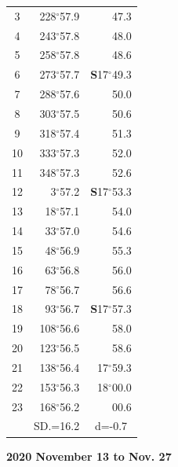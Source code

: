 \documentclass[10pt, a4paper]{report}
\begin{document}
\begin{scriptsize}
\begin{tabular*}{0.2\textwidth}[t]{@{\extracolsep{\fill}}|c|rr|}
3 & 228$^\circ$57.9 & \raisebox{0.24ex}{\boldmath$\cdot$~\boldmath$\cdot$~~}47.3\\
4 & 243$^\circ$57.8 & 48.0\\
5 & 258$^\circ$57.8 & 48.6\\[2Pt]
6 & 273$^\circ$57.7 & \textbf{S}17$^\circ$49.3\\
7 & 288$^\circ$57.6 & 50.0\\
8 & 303$^\circ$57.5 & 50.6\\
9 & 318$^\circ$57.4 & \raisebox{0.24ex}{\boldmath$\cdot$~\boldmath$\cdot$~~}51.3\\
10 & 333$^\circ$57.3 & 52.0\\
11 & 348$^\circ$57.3 & 52.6\\[2Pt]
12 & 3$^\circ$57.2 & \textbf{S}17$^\circ$53.3\\
13 & 18$^\circ$57.1 & 54.0\\
14 & 33$^\circ$57.0 & 54.6\\
15 & 48$^\circ$56.9 & \raisebox{0.24ex}{\boldmath$\cdot$~\boldmath$\cdot$~~}55.3\\
16 & 63$^\circ$56.8 & 56.0\\
17 & 78$^\circ$56.7 & 56.6\\[2Pt]
18 & 93$^\circ$56.7 & \textbf{S}17$^\circ$57.3\\
19 & 108$^\circ$56.6 & 58.0\\
20 & 123$^\circ$56.5 & 58.6\\
21 & 138$^\circ$56.4 & 17$^\circ$59.3\\
22 & 153$^\circ$56.3 & 18$^\circ$00.0\\
23 & 168$^\circ$56.2 & 00.6\\
\hline
\rule{0pt}{2.4ex} & \multicolumn{1}{c}{SD.=16.2} & \multicolumn{1}{c|}{d=-0.7}\\
\hline
\end{tabular*}

\end{scriptsize}
\newpage
\sffamily
\noindent
\begin{flushright}
\textbf{2020 November 13 to Nov. 27}\par
\end{flushright}
\end{document}
